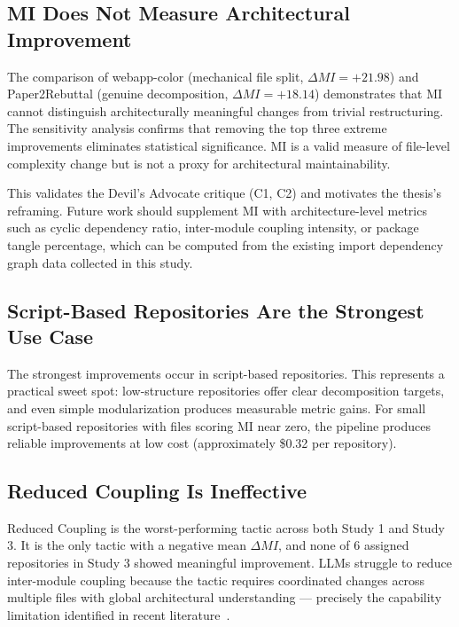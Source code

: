 \subsection{MI Does Not Measure Architectural Improvement}

The comparison of webapp-color (mechanical file split, $\Delta MI = +21.98$) and Paper2\-Rebuttal (genuine decomposition, $\Delta MI = +18.14$) demonstrates that MI cannot distinguish architecturally meaningful changes from trivial restructuring. The sensitivity analysis confirms that removing the top three extreme improvements eliminates statistical significance. MI is a valid measure of file-level complexity change but is not a proxy for architectural maintainability.

This validates the Devil's Advocate critique (C1, C2) and motivates the thesis's reframing. Future work should supplement MI with architecture-level metrics such as cyclic dependency ratio, inter-module coupling intensity, or package tangle percentage, which can be computed from the existing import dependency graph data collected in this study.

\subsection{Script-Based Repositories Are the Strongest Use Case}

The strongest improvements occur in script-based repositories. This represents a practical sweet spot: low-structure repositories offer clear decomposition targets, and even simple modularization produces measurable metric gains. For small script-based repositories with files scoring MI near zero, the pipeline produces reliable improvements at low cost (approximately \$0.32 per repository).

\subsection{Reduced Coupling Is Ineffective}

Reduced Coupling is the worst-performing tactic across both Study 1 and Study 3. It is the only tactic with a negative mean $\Delta MI$, and none of 6 assigned repositories in Study 3 showed meaningful improvement. LLMs struggle to reduce inter-module coupling because the tactic requires coordinated changes across multiple files with global architectural understanding — precisely the capability limitation identified in recent literature~\cite{horikawa2025agentic}.

